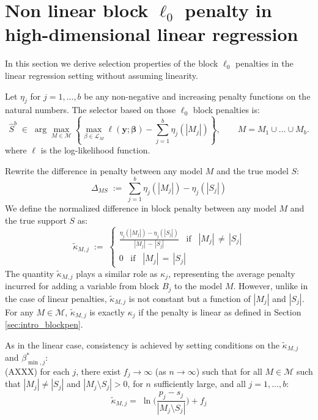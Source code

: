 \documentclass[aos]{imsart}
\theoremstyle{plain}
\newcommand{\M}{\mathcal{M}}
\newcommand{\bs}{\boldsymbol}
\begin{document}
\section{Non linear block $\ell_0$ penalty in high-dimensional linear regression}\label{sec:appendixnonlinear}

In this section we derive selection properties of the block $\ell_0$ penalties in the linear regression setting without assuming linearity. 

Let $\eta_j$ for $j=1,\ldots,b$ be any non-negative and increasing penalty functions on the natural numbers. The selector based on those $\ell_0$ block penalties is:
\begin{equation}
  \widehat S^b\;\in\;\arg\max_{M\in \M} \left\{\max_{\beta\in \mathcal{L}_M} \ell(\bs y;\bs \beta)-\sum_{j=1}^b\eta_j (|M_j|)\right\},\qquad M=M_1\cup \ldots\cup M_b.	
\end{equation}
where $\ell$ is the log-likelihood function.

Rewrite the difference in penalty between any model $M$ and the true model $S$:
\begin{equation}\label{eq:DeltaMbis}
\Delta_{MS} \; := \; \sum_{j=1}^b \eta_j(|M_j|)-\eta_j(|S_j|)
\end{equation}
We define the normalized difference in block penalty between any model $M$ and the true support $S$ as:
 $$\tilde{\kappa}_{M, j}\; := \; \begin{cases}
     \frac{\eta_j(|M_j|)-\eta_j(|S_j|)}{|M_j|\,-\,|S_j|} \;\;\; \text{if}\;\;\; |M_j|\,\neq\,|S_j| \\
     0 \;\;\;\text{if}\;\;\; |M_j|\,=\,|S_j|
 \end{cases}  $$
The quantity $\tilde{\kappa}_{M, j}$ plays a similar role as $\kappa_j$, representing the average penalty incurred for adding a variable from block $B_j$ to the model $M$. However, unlike in the case of linear penalties, $\tilde{\kappa}_{M, j}$ is not constant but a function of $|M_j|$ and $|S_j|$. For any $M\in\M$, $\tilde{\kappa}_{M, j}$ is exactly $\kappa_j$ if the penalty is linear as defined in Section \ref{sec:intro_blockpen}.

As in the linear case, consistency is achieved by setting conditions on the $\tilde{\kappa}_{M, j}$ and $\beta^*_{\min, j}$:\\
(AXXX) for each $j$, there exist $f_j\to \infty$ (as $n\to \infty$) such that for all $M \in \M$ such that $|M_j| \neq |S_j|$ and $|M_j \setminus S_j| >0$, for $n$ sufficiently large, and  all $j=1,\ldots,b$:
\begin{equation}\label{cond:suffIregnonlinpen}
    \tilde{\kappa}_{M, j} =\;\ln\bigg(\frac{p_j-s_j}{|M_j \setminus S_j| }\bigg) + f_j
\end{equation}
\end{document}
